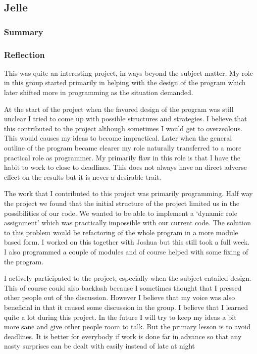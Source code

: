 \newpage
\subsection{Jelle}
\subsubsection{Summary}

\subsubsection{Reflection}
This was quite an interesting project, in ways beyond the subject matter. My role in this group started primarily in helping with the design of the program which later shifted more in programming as the situation demanded.

At the start of the project when the favored design of the program was still unclear I tried to come up with possible structures and strategies. I believe that this contributed to the project although sometimes I would get to overzealous. This would causes my ideas to become impractical. 
Later when the general outline of the program became clearer my role naturally transferred to a more practical role as programmer. My primarily flaw in this role is that I have the habit to work to close to deadlines. This does not always have an direct adverse effect on the results but it is never a desirable trait. 

The work that I contributed to this project was primarily programming. Half way the project we found that the initial structure of the project limited us in the possibilities of our code. We wanted to be able to implement a ‘dynamic role assignment’ which was practically impossible with our current code. The solution to this problem would be refactoring of the whole program in a more module based form. I worked on this together with Joshua but this still took a full week. 
I also programmed a couple of modules and of course helped with some fixing of the program. 

I actively participated to the project, especially when the subject entailed design. This of course could also backlash because I sometimes thought that I pressed other people out of the discussion. However I believe that my voice was also beneficial in that it caused some discussion in the group.
I believe that I learned quite a lot during this project. In the future I will try to keep my ideas a bit more sane and give other people room to talk. But the primary lesson is to avoid deadlines. It is better for everybody if work is done far in advance so that any nasty surprises can be dealt with easily instead of late at night 
